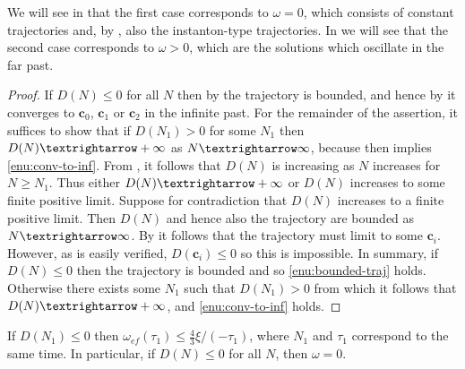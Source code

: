 We will see in  that the first case corresponds to $\omega=0$, which consists of constant trajectories and, by , also the instanton-type trajectories. In  we will see that the second case corresponds to $\omega>0$, which are the solutions which oscillate in the far past.
\begin{proof}
If $D(N)\leq0$ for all $N$ then by  the trajectory is bounded, and hence by  it converges to $\mathbf{c}_{0}$, $\mathbf{c}_{1}$ or $\mathbf{c}_{2}$ in the infinite past. For the remainder of the assertion, it suffices to show that if $D(N_{1})>0$ for some $N_{1}$ then $D(N)\textrightarrow+\infty$ as $N\textrightarrow\infty$, because then  implies \ref{enu:conv-to-inf}. From , it follows that $D(N)$ is increasing as $N$ increases for $N\geq N_{1}$. Thus either $D(N)\textrightarrow+\infty$ or $D(N)$ increases to some finite positive limit. Suppose for contradiction that $D(N)$ increases to a finite positive limit. Then $D(N)$ and hence also the trajectory are bounded as $N\textrightarrow\infty$. By  it follows that the trajectory must limit to some $\mathbf{c}_{i}$. However, as is easily verified, $D(\mathbf{c}_{i})\leq0$ so this is impossible. In summary, if $D(N)\leq0$ then the trajectory is bounded and so \ref{enu:bounded-traj} holds. Otherwise there exists some $N_{1}$ such that $D(N_{1})>0$ from which it follows that $D(N)\textrightarrow+\infty$, and \ref{enu:conv-to-inf} holds. 
\end{proof}
\begin{lem}
\label{lem:D-negative-omega-zero}If $D(N_{1})\leq0$ then $\omega_{ef}(\tau_{1})\leq\tfrac{4}{3}\xi/(-\tau_{1})$, where $N_{1}$ and $\tau_{1}$ correspond to the same time. In particular, if $D(N)\leq0$ for all $N$, then $\omega=0$. 
\end{lem}

